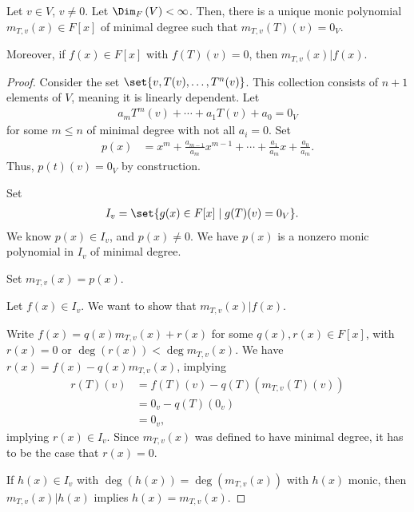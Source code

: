 \documentclass[10pt]{mypackage}
\begin{document}
\begin{theorem}
  Let $v\in V$, $v\neq 0$. Let $\Dim_{F}\left(V\right) < \infty$. Then, there is a unique monic polynomial $m_{T,v}(x)\in F[x]$ of minimal degree such that $m_{T,v}\left(T\right)\left(v\right) = 0_V$.\newline

  Moreover, if $f(x)\in F[x]$ with $f(T)(v) = 0$, then $m_{T,v}(x)|f(x)$.
\end{theorem}
\begin{proof}
  Consider the set $\set{v,T(v),\dots,T^n(v)}$. This collection consists of $n+1$ elements of $V$, meaning it is linearly dependent. Let
  \begin{align*}
    a_mT^{m}\left(v\right) + \cdots + a_1T(v) + a_0 = 0_V
  \end{align*}
  for some $m \leq n$ of minimal degree with not all $a_i = 0$. Set
  \begin{align*}
    p(x) &= x^m + \frac{a_{m-1}}{a_m}x^{m-1} + \cdots + \frac{a_1}{a_m}x + \frac{a_0}{a_m}.
  \end{align*}
  Thus, $p(t)(v) = 0_V$ by construction.\newline

  Set
  \begin{align*}
    I_v &= \set{g(x)\in F[x]\mid g(T)(v) = 0_V}.
  \end{align*}
  We know $p(x)\in I_v$, and $p(x)\neq 0$. We have $p(x)$ is a nonzero monic polynomial in $I_v$ of minimal degree.\newline

  Set $m_{T,v}(x) = p(x)$.\newline

  Let $f(x)\in I_v$. We want to show that $m_{T,v}(x)|f(x)$.\newline

  Write $f(x) = q(x)m_{T,v}(x) + r(x)$ for some $q(x),r(x)\in F[x]$, with $r(x) = 0$ or $\deg \left(r(x)\right) < \deg m_{T,v}(x)$. We have $r(x) = f(x) - q(x)m_{T,v}(x)$, implying
  \begin{align*}
    r(T)(v) &= f(T)(v) - q(T)\left(m_{T,v}\left(T\right)(v)\right)\\
            &= 0_v- q(T)\left(0_v\right)\\
            &= 0_v,
  \end{align*}
  implying $r(x)\in I_v$. Since $m_{T,v}(x)$ was defined to have minimal degree, it has to be the case that $r(x) = 0$.\newline

  If $h(x) \in I_{v}$ with $\deg \left(h(x)\right) = \deg\left(m_{T,v}(x)\right)$ with $h(x)$ monic, then $m_{T,v}(x)|h(x)$ implies $h(x) = m_{T,v}(x)$.
\end{proof}
\end{document}
